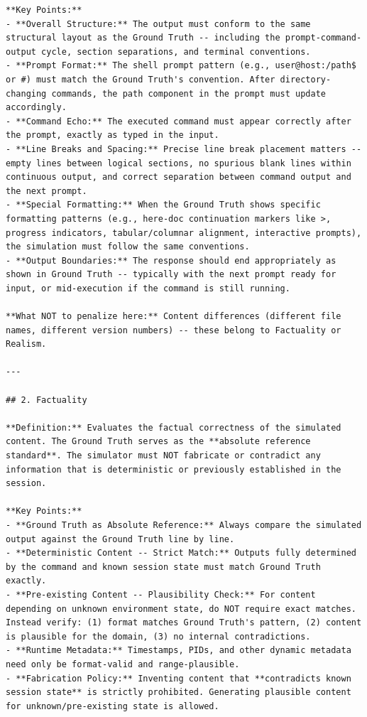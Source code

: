 \documentclass{llmxive}
\begin{document}
\begin{lstlisting}
**Key Points:**
- **Overall Structure:** The output must conform to the same structural layout as the Ground Truth -- including the prompt-command-output cycle, section separations, and terminal conventions.
- **Prompt Format:** The shell prompt pattern (e.g., user@host:/path$ or #) must match the Ground Truth's convention. After directory-changing commands, the path component in the prompt must update accordingly.
- **Command Echo:** The executed command must appear correctly after the prompt, exactly as typed in the input.
- **Line Breaks and Spacing:** Precise line break placement matters -- empty lines between logical sections, no spurious blank lines within continuous output, and correct separation between command output and the next prompt.
- **Special Formatting:** When the Ground Truth shows specific formatting patterns (e.g., here-doc continuation markers like >, progress indicators, tabular/columnar alignment, interactive prompts), the simulation must follow the same conventions.
- **Output Boundaries:** The response should end appropriately as shown in Ground Truth -- typically with the next prompt ready for input, or mid-execution if the command is still running.

**What NOT to penalize here:** Content differences (different file names, different version numbers) -- these belong to Factuality or Realism.

---

## 2. Factuality

**Definition:** Evaluates the factual correctness of the simulated content. The Ground Truth serves as the **absolute reference standard**. The simulator must NOT fabricate or contradict any information that is deterministic or previously established in the session.

**Key Points:**
- **Ground Truth as Absolute Reference:** Always compare the simulated output against the Ground Truth line by line.
- **Deterministic Content -- Strict Match:** Outputs fully determined by the command and known session state must match Ground Truth exactly.
- **Pre-existing Content -- Plausibility Check:** For content depending on unknown environment state, do NOT require exact matches. Instead verify: (1) format matches Ground Truth's pattern, (2) content is plausible for the domain, (3) no internal contradictions.
- **Runtime Metadata:** Timestamps, PIDs, and other dynamic metadata need only be format-valid and range-plausible.
- **Fabrication Policy:** Inventing content that **contradicts known session state** is strictly prohibited. Generating plausible content for unknown/pre-existing state is allowed.


\end{lstlisting}
\end{document}
